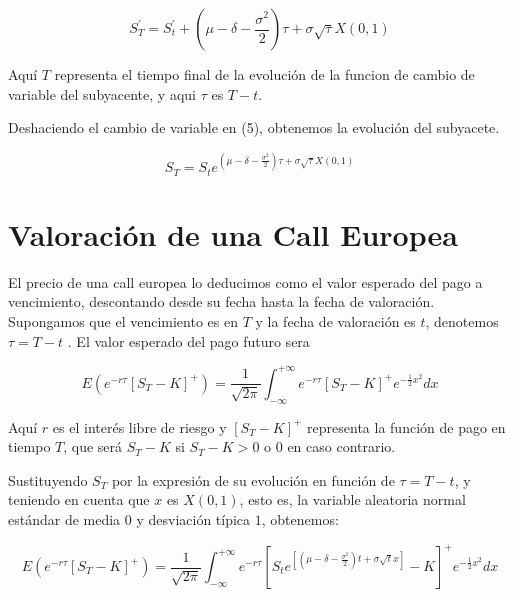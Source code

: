 \documentclass[12pt]{article}
\begin{document}
\begin{equation}
	S_{T}^{'} = S_{t}^{'} + \left(\mu - \delta - \frac{\sigma^{2}}{2}\right) \tau + \sigma\sqrt{\tau}X(0,1)
\end{equation}

Aqu\'{i} $T$ representa el tiempo final de la evoluci\'{o}n de la funcion de cambio de variable del subyacente, y aqui $\tau$ es 
$T - t$.
\newline

Deshaciendo el cambio de variable en (5), obtenemos la evoluci\'{o}n del subyacete.
\newline

\begin{equation}
	S_{T}=S_{t}e^{\left( \mu - \delta - \frac{\sigma^{2}}{2} \right)\tau + \sigma\sqrt{\tau}X\left( 0,1\right)}
\end{equation}
\newpage

\section{Valoraci\'{o}n de una Call Europea}
El precio de una call europea lo deducimos como el valor esperado del pago a vencimiento, descontando desde su fecha hasta
la fecha de valoraci\'{o}n. Supongamos que el vencimiento es en $T$ y la fecha de valoraci\'{o}n es $t$, denotemos $\tau = T - t$ . 
El valor esperado del pago futuro sera

\begin{equation}
	E\left( e^{-r\tau} \left[ S_{T} - K \right] ^{+} \right) = \frac{1}{\sqrt{2\pi}} \int_{-\infty}^{+\infty}e^{-r\tau}
	\left[ S_{T} - K \right] ^{+} e^{-\frac{1}{2}x^{2}}dx
\end{equation}
\newline

Aqu\'{i} $r$ es el inter\'{e}s libre de riesgo y $\left[S_{T}-K\right] ^{+}$ representa la funci\'{o}n de pago en tiempo $T$, que ser\'{a} $S_{T}-K$
si $S_{T}-K>0$ o $0$ en caso contrario.
\newline

Sustituyendo $S_{T}$ por la expresi\'{o}n de su evoluci\'{o}n en funci\'{o}n de $\tau = T - t$, y teniendo en cuenta que $x$ es $X\left(0,1
\right)$, esto es, la variable aleatoria normal est\'{a}ndar de media $0$ y desviaci\'{o}n t\'{i}pica $1$, obtenemos:
\newline

\begin{equation}
	E\left( e^{-r\tau} \left[ S_{T} - K \right] ^{+} \right) = \frac{1}{\sqrt{2\pi}}\int_{-\infty}^{+\infty}e^{-r\tau}
	\left[S_{t}e^{\left[\left(\mu-\delta-\frac{\sigma^{2}}{2}\right)t+\sigma\sqrt{t}x\right]}-K\right]^{+}e^{-\frac{1}{2}x^{2}}
	dx	
\end{equation}
\newline
\end{document}
